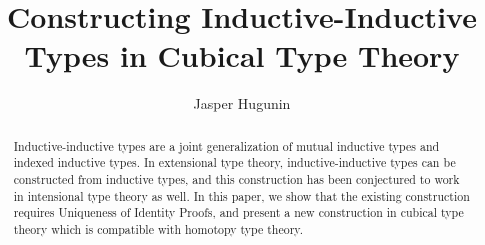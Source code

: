 \documentclass[runningheads]{llncs}
\begin{document}
\title{Constructing Inductive-Inductive Types in Cubical Type Theory}

\author{Jasper Hugunin}

\maketitle

\begin{abstract}
Inductive-inductive types are a joint generalization of mutual inductive types and indexed inductive types. In extensional type theory, inductive-inductive types can be constructed from inductive types, and this construction has been conjectured to work in intensional type theory as well. In this paper, we show that the existing construction requires Uniqueness of Identity Proofs, and present a new construction in cubical type theory which is compatible with homotopy type theory.
\end{abstract}
\end{document}
